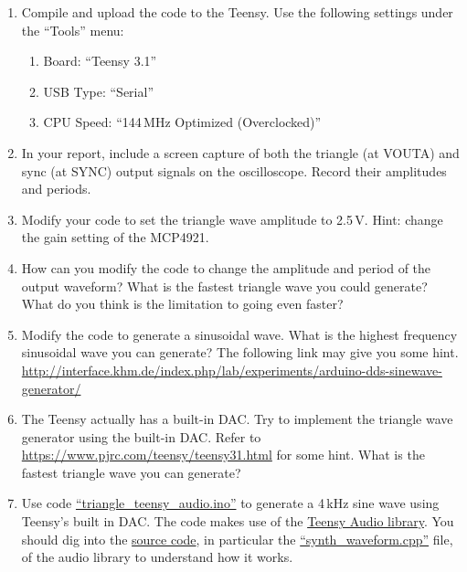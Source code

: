 \documentclass[letterpaper, 11pt]{article}
\begin{document}
\begin{enumerate}
\item Compile and upload the code to the Teensy. Use the following settings under the ``Tools'' menu: 
	\begin{enumerate}
		\item Board: ``Teensy 3.1''
		\item USB Type: ``Serial''
		\item CPU Speed: ``144\,MHz Optimized (Overclocked)''
	\end{enumerate}

\item In your report, include a screen capture of both the triangle (at VOUTA) and sync (at SYNC) output signals on the oscilloscope. Record their amplitudes and periods.

\item Modify your code to set the triangle wave amplitude to 2.5\,V. Hint: change the gain setting of the MCP4921. 

\item How can you modify the code to change the amplitude and period of the output waveform? What is the fastest triangle wave you could generate? What do you think is the limitation to going even faster?

\item Modify the code to generate a sinusoidal wave. What is the highest frequency sinusoidal wave you can generate? The following link may give you some hint. 
\url{http://interface.khm.de/index.php/lab/experiments/arduino-dds-sinewave-generator/} 


\item The Teensy actually has a built-in DAC. Try to implement the triangle wave generator using the built-in DAC. Refer to \url{https://www.pjrc.com/teensy/teensy31.html} for some hint. What is the fastest triangle wave you can generate?

\item Use code \href{https://github.com/ucdart/UCD-EEC134/blob/master/labs/lab1/code/triangle_teensy_audio/triangle_teensy_audio.ino}{``triangle\_teensy\_audio.ino''} to generate a 4\,kHz sine wave using Teensy's built in DAC. The code makes use of the \href{http://www.pjrc.com/teensy/td_libs_Audio.html}{Teensy Audio library}. You should dig into the \href{https://github.com/PaulStoffregen/Audio}{source code}, in particular the \href{https://github.com/PaulStoffregen/Audio/blob/master/synth_waveform.cpp}{``synth\_waveform.cpp''} file, of the audio library to understand how it works. 
\end{enumerate}
\end{document}

